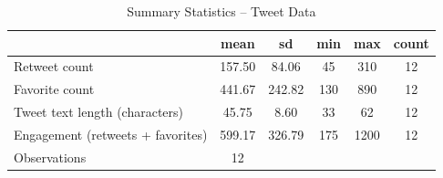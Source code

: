\begin{table}[htbp]\centering
\def\sym#1{\ifmmode^{#1}\else\(^{#1}\)\fi}
\caption{Summary Statistics -- Tweet Data}
\begin{tabular}{l*{1}{ccccc}}
\toprule
                    &        mean&          sd&         min&         max&       count\\
\midrule
Retweet count       &      157.50&       84.06&          45&         310&          12\\
Favorite count      &      441.67&      242.82&         130&         890&          12\\
Tweet text length (characters)&       45.75&        8.60&          33&          62&          12\\
Engagement (retweets + favorites)&      599.17&      326.79&         175&        1200&          12\\
\midrule
Observations        &          12&            &            &            &            \\
\bottomrule
\end{tabular}
\end{table}
